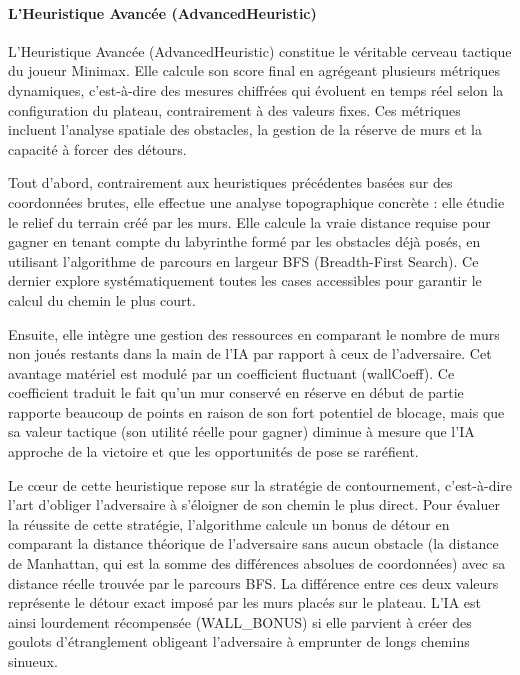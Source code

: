 \documentclass[a4paper]{article}
\begin{document}
\paragraph{L'Heuristique Avancée (AdvancedHeuristic)}

L'Heuristique Avancée (AdvancedHeuristic) constitue le véritable cerveau tactique du joueur Minimax. Elle calcule son score final en agrégeant plusieurs métriques dynamiques, c'est-à-dire des mesures chiffrées qui évoluent en temps réel selon la configuration du plateau, contrairement à des valeurs fixes. Ces métriques incluent l'analyse spatiale des obstacles, la gestion de la réserve de murs et la capacité à forcer des détours.

Tout d'abord, contrairement aux heuristiques précédentes basées sur des coordonnées brutes, elle effectue une analyse topographique concrète : elle étudie le relief du terrain créé par les murs. Elle calcule la vraie distance requise pour gagner en tenant compte du labyrinthe formé par les obstacles déjà posés, en utilisant l'algorithme de parcours en largeur BFS (Breadth-First Search). Ce dernier explore systématiquement toutes les cases accessibles pour garantir le calcul du chemin le plus court.

Ensuite, elle intègre une gestion des ressources en comparant le nombre de murs non joués restants dans la main de l'IA par rapport à ceux de l'adversaire. Cet avantage matériel est modulé par un coefficient fluctuant (wallCoeff). Ce coefficient traduit le fait qu'un mur conservé en réserve en début de partie rapporte beaucoup de points en raison de son fort potentiel de blocage, mais que sa valeur tactique (son utilité réelle pour gagner) diminue à mesure que l'IA approche de la victoire et que les opportunités de pose se raréfient.

Le cœur de cette heuristique repose sur la stratégie de contournement, c'est-à-dire l'art d'obliger l'adversaire à s'éloigner de son chemin le plus direct. Pour évaluer la réussite de cette stratégie, l'algorithme calcule un bonus de détour en comparant la distance théorique de l'adversaire sans aucun obstacle (la distance de Manhattan, qui est la somme des différences absolues de coordonnées) avec sa distance réelle trouvée par le parcours BFS. La différence entre ces deux valeurs représente le détour exact imposé par les murs placés sur le plateau. L'IA est ainsi lourdement récompensée (WALL\_BONUS) si elle parvient à créer des goulots d'étranglement obligeant l'adversaire à emprunter de longs chemins sinueux.
\end{document}

